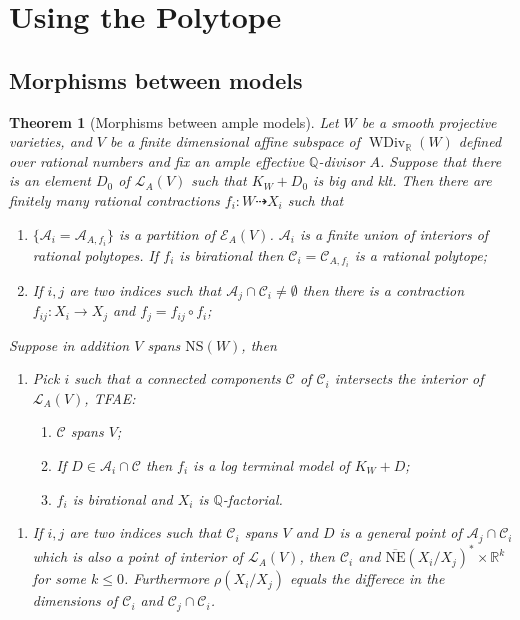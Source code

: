 \documentclass{article}
\newtheorem{thm}[defn]{Theorem}
\begin{document}
\section{Using the Polytope}

\subsection{Morphisms between models}

\begin{thm}[Morphisms between ample models]\label{mapbetweenAM}
  Let $W$ be a smooth projective   varieties, and  $ V $ be a finite dimensional affine subspace of $ \operatorname{WDiv}_{\mathbb{R}}(W) $ defined over rational numbers and fix an ample effective $\mathbb{Q}$-divisor $A$. Suppose that there is an element $D_{0}$ of $\mathcal{L}_{A}(V)$ such that $K_{W}+D_{0}$ is big and klt. Then there are finitely many rational contractions $ f_i:W\dashrightarrow X_i $ such that
  \begin{enumerate}[1]
    \item $ \{\mathcal{A}_i=\mathcal{A}_{A,f_i}\} $ is a partition of $ \mathcal{E}_{A}(V) $. $ \mathcal{A}_i $ is a finite union of interiors of rational polytopes. If $ f_i $ is birational then $ \mathcal{C}_i=\mathcal{C}_{A,f_i} $ is a rational polytope;
    \item If $ i,j $ are two indices such that $ \mathcal{A}_j\cap \mathcal{C}_i\neq \emptyset $ then there is a contraction $ f_{ij}:X_i\to X_j $ and $ f_j=f_{ij}\circ f_i $;
  \end{enumerate}
  Suppose in addition $ V $ spans $ \mathrm{NS}(W) $, then
  \begin{enumerate}[3]
    \item Pick $ i $ such that a connected components $ \mathcal{C} $ of $ \mathcal{C}_i $ intersects the interior of $ \mathcal{L}_A(V) $, TFAE:
    \begin{enumerate}[a]
      \item $ \mathcal{C} $ spans $ V $;
      \item If $ D\in \mathcal{A}_i\cap \mathcal{C} $ then $ f_i $ is a log terminal model of $ K_W+D $;
      \item $ f_i $ is birational and $ X_i $ is $ \mathbb{Q} $-factorial.
    \end{enumerate}
  \end{enumerate}
  \begin{enumerate}[4]
    \item If $ i,j $ are two indices such that $ \mathcal{C}_i $ spans $ V $ and $ D $ is a general point of $ \mathcal{A}_j\cap \mathcal{C}_i $ which is also a point of interior of $ \mathcal{L}_A(V) $, then $ \mathcal{C}_i $ and $ \overline{\mathrm{NE}}(X_i/X_j)^*\times \mathbb{R}^k $ for some $ k\leqslant 0 $. Furthermore $ \rho(X_i/X_j) $ equals the differece in the dimensions of $ \mathcal{C}_i $ and $ \mathcal{C}_j\cap \mathcal{C}_i $.
  \end{enumerate}
\end{thm}
\end{document}
